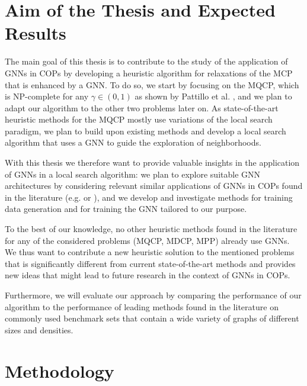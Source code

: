 \documentclass [11pt]{article}
\begin{document}
\section{Aim of the Thesis and Expected Results}
The main goal of this thesis is to contribute to the study of the application of GNNs in COPs by developing a heuristic algorithm for relaxations of the MCP that is enhanced by a GNN. To do so, we start by focusing on the MQCP, which is NP-complete for any $\gamma \in (0,1)$ as shown by Pattillo et al. \cite{pattillo_maximum_2013}, and we plan to adapt our algorithm to the other two problems later on. 
As state-of-the-art heuristic methods for the MQCP mostly use variations of the local search paradigm, we plan to build upon existing methods and develop a local search algorithm that uses a GNN to guide the exploration of neighborhoods. 

With this thesis we therefore want to provide valuable insights in the application of GNNs in a local search algorithm: we plan to explore suitable GNN architectures by considering relevant similar applications of GNNs in COPs found in the literature (e.g. \cite{Kool2019} or \cite{Hudson2021}), and we develop and investigate methods for training data generation and for training the GNN tailored to our purpose. 

To the best of our knowledge, no other heuristic methods found in the literature for any of the considered problems (MQCP, MDCP, MPP) already use GNNs. We thus want to contribute a new heuristic solution to the mentioned problems that is significantly different from current state-of-the-art methods and provides new ideas that might lead to future research in the context of GNNs in COPs. 

Furthermore, 
we will evaluate our approach by comparing the performance of our algorithm to the performance of leading methods found in the literature on commonly used benchmark sets that contain a wide variety of graphs of different sizes and densities. 

\section{Methodology}
\end{document}
